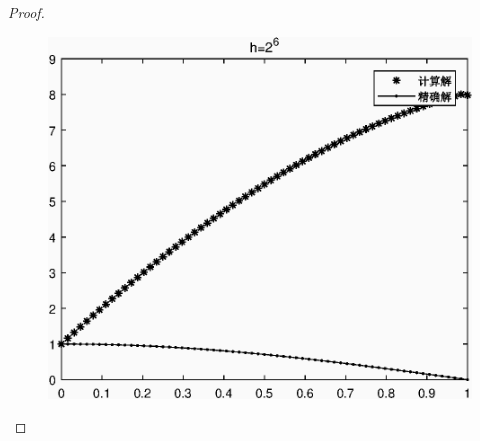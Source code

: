 \documentclass{article}%
\begin{document}
\begin{proof}
	\begin{figure}[H]
	\includegraphics[width=1\linewidth]{week15_1_6.eps}
	\label{Fig:6}
	\end{figure}

\end{proof}
\end{document}
